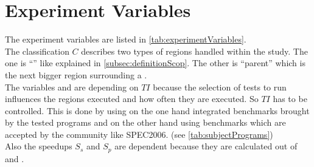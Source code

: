 \section{Experiment Variables}
The experiment variables are listed in \autoref{tab:experimentVariables}.\\
The classification \(C\) describes two types of regions handled within the study.
The one is \enquote{\scop} like explained in \autoref{subsec:definitionScop}.
The other is \enquote{parent} which is the next bigger region surrounding a \scop.\\
The variables \dyncovs and \dyncovp are depending on \(TI\) because the selection of tests to run influences the regions executed and how often they are executed.
So \(TI\) has to be controlled.
This is done by using on the one hand integrated benchmarks brought by the tested programs and on the other hand using benchmarks which are accepted by the community like SPEC2006. (see \autoref{tab:subjectPrograms})\\
Also the speedups \(S_s\) and \(S_p\) are dependent because they are calculated out of \dyncovs and \dyncovp.
